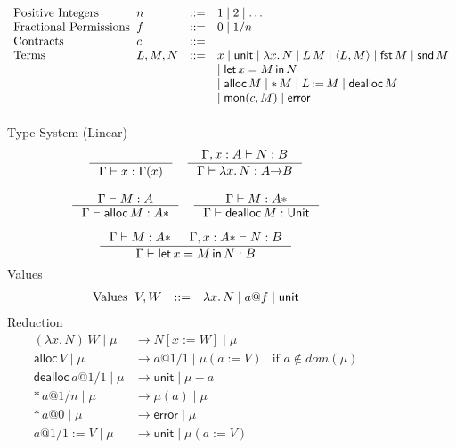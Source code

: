 \documentclass[acmsmall]{acmart}
\makeatletter
\newcommand{\ba}{\begin{array}}
\newcommand{\ea}{\end{array}}
\newenvironment{syntax}{\[\ba{l@{\;\;}lcl}}{\ea\]}
\newcommand{\dotspace}{.\,}
\newcommand{\lam}[1]{\lambda #1 \dotspace}
\newcommand{\app}{\,}
\newcommand{\UnitT}{\mathsf{Unit}}
\newcommand{\RefT}[1]{#1\mathtt{*}}
\newcommand{\alloc}[1]{\mathsf{alloc}\, #1}
\newcommand{\deref}[1]{\mathtt{*}\, #1}
\newcommand{\update}[2]{#1\mathop{:=}#2}
\newcommand{\dealloc}[1]{\mathsf{dealloc}\,#1}
\newcommand{\reduce}{\longrightarrow}
\newcommand{\pair}[2]{\langle #1 , #2 \rangle}
\newcommand{\fst}[1]{\mathsf{fst}\, #1}
\newcommand{\snd}[1]{\mathsf{snd}\, #1}
\newcommand{\unit}{\mathsf{unit}}
\newcommand{\error}{\mathsf{error}}
\newcommand{\dom}[1]{\mathit{dom}(#1)}
\newcommand{\tu}{{\to}}
\newcommand{\mon}[2]{\mathsf{mon}(#1,#2)}
\newcommand{\addr}[2]{#1 @ #2}
\newcommand{\LET}[3]{\mathsf{let}\,#1 = #2 \,\mathsf{in}\,#3}
\makeatother
\begin{document}
\begin{figure}
  \raggedright
  \begin{syntax}
    \text{Positive Integers} & n & ::= & 1 \mid 2 \mid \ldots \\
    \text{Fractional Permissions} & f & ::= & 0 \mid 1/n \\
    \text{Contracts} & c & ::= & \\
    \text{Terms} & L,M,N & ::= & x \mid \unit \mid \lam{x} N \mid L \app M
       \mid \pair{L}{M} \mid \fst{M} \mid \snd{M} \\
       &&& \mid \LET{x}{M}{N} \\
       &&& \mid \alloc{M} \mid \deref{M} \mid \update{L}{M} \mid \dealloc{M}\\
       &&& \mid \mon{c}{M} \mid \error \\[2ex]
  \end{syntax}
  Type System (Linear)
  \begin{gather*}
    \inference{}{\Gamma \vdash x : \Gamma(x)} \quad
    \inference{\Gamma,x:A \vdash N : B}
              {\Gamma \vdash \lam{x}N : A \tu B} \\[2ex]
    \inference{\Gamma \vdash M : A}
              {\Gamma \vdash \alloc{M} : \RefT{A}} \quad
    \inference{\Gamma \vdash M : \RefT{A}}
              {\Gamma \vdash \dealloc{M} : \UnitT} \\[2ex]
    \inference{\Gamma \vdash M : \RefT{A} & \Gamma,x:\RefT{A} \vdash N : B}
              {\Gamma \vdash \LET{x}{M}{N} : B}
  \end{gather*}
  Values
  \begin{syntax}
    \text{Values} & V,W & ::= & \lam{x}N \mid \addr{a}{f}
      \mid \unit
  \end{syntax}
  Reduction
  \begin{align*}
    (\lam{x} N) \app W \mid \mu &\reduce N[x:=W] \mid \mu \\
    \alloc{V} \mid \mu &\reduce \addr{a}{1/1} \mid \mu(a := V) & \text{if } a \notin \dom{\mu} \\
    \dealloc{\addr{a}{1/1}} \mid \mu & \reduce \unit \mid \mu - {a} \\
    \deref{\addr{a}{1/n}} \mid \mu &\reduce \mu(a) \mid \mu \\
    \deref{\addr{a}{0}} \mid \mu &\reduce \error \mid \mu \\
    \update{\addr{a}{1/1}}{V} \mid \mu & \reduce \unit \mid \mu(a:= V)
  \end{align*}


\end{figure}
\end{document}
